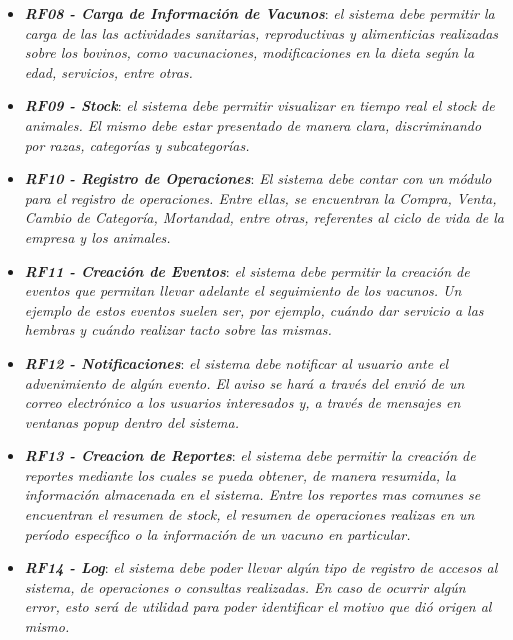 \documentclass[11pt,oneside]{book}
\begin{document}
\begin{itemize}
\item \textit{\textbf{RF08 - Carga de Información de Vacunos}}: \textit{el sistema debe permitir la carga de las las actividades sanitarias, reproductivas y alimenticias realizadas sobre los bovinos, como vacunaciones, modificaciones en la dieta según la edad, servicios, entre otras.}

\item \textit{\textbf{RF09 - Stock}}: \textit{el sistema debe permitir visualizar en tiempo real el stock de animales. El mismo debe estar presentado de manera clara, discriminando por razas, categorías y subcategorías.}

\item \textit{\textbf{RF10 - Registro de Operaciones}}: \textit{El sistema debe contar con un módulo para el registro de operaciones. Entre ellas, se encuentran la Compra, Venta, Cambio de Categoría, Mortandad, entre otras, referentes al ciclo de vida de la empresa y los animales.}

\item \textit{\textbf{RF11 - Creación de Eventos}}: \textit{el sistema debe permitir la creación de eventos que permitan llevar adelante el seguimiento de los vacunos. Un ejemplo de estos eventos suelen ser, por ejemplo, cuándo dar servicio a las hembras y cuándo realizar tacto sobre las mismas.}

\item \textit{\textbf{RF12 - Notificaciones}}: \textit{el sistema debe notificar al usuario ante el advenimiento de algún evento. El aviso se hará a través del envió de un correo electrónico a los usuarios interesados y, a través de mensajes en ventanas popup dentro del sistema.}

\item \textit{\textbf{RF13 - Creacion de Reportes}}: \textit{el sistema debe permitir la creación de reportes mediante los cuales se pueda obtener, de manera resumida, la información almacenada en el sistema. Entre los reportes mas comunes se encuentran el resumen de stock, el resumen de operaciones realizas en un período específico o la información de un vacuno en particular.}

\item \textit{\textbf{RF14 - Log}}: \textit{el sistema debe poder llevar algún tipo de registro de accesos al sistema, de operaciones o consultas realizadas. En caso de ocurrir algún error, esto será de utilidad para poder identificar el motivo que dió origen al mismo.}
\end{itemize}
\end{document}
